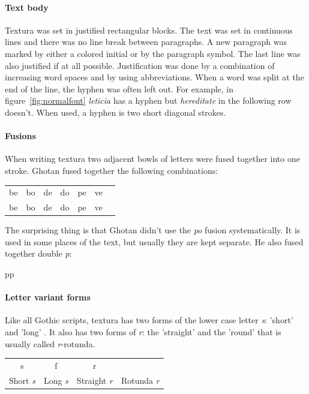\documentclass[a4paper, 12pt]{article}
\newcommand{\sample}[1]{{\mstexturafamily\fontsize{18}{18}\selectfont #1}}
\begin{document}
\paragraph{Text body} Textura was set in justified rectangular blocks.
The text was set in continuous lines and there was no line break
between paragraphs. A new paragraph was marked by either a colored
initial or by the paragraph symbol. The last line was also justified
if at all possible. Justification was done by a combination of
increasing word spaces and by using abbreviations. When a word was
split at the end of the line, the hyphen was often left out. For
example, in figure~\ref{fig:normalfont} \emph{leticia} has a hyphen
but \emph{hereditate} in the following row doesn't. When used, a
hyphen is two short diagonal strokes.

\paragraph{Fusions} 

When writing textura two adjacent bowls of letters were fused together
into one stroke. Ghotan fused together the following combinations:
\begin{center}
  \begin{tabular}{ccccccc}
  \sample{be} & \sample{bo} & \sample{de} & \sample{do} & \sample{pe}
   & \sample{ve} \\    
  be & bo & de & do & pe & ve \\
  \end{tabular}
\end{center}

The surprising thing is that Ghotan didn't use the \emph{po} fusion
systematically. It is used in some places of the text, but usually
they are kept separate. He also fused together double \emph{p}:
\begin{center}
  \sample{pp}
\end{center}


\paragraph{Letter variant forms}

Like all Gothic scripts, textura has two forms of the lower case
letter \emph{s}: 'short'  and 'long' . It also
has two forms of \emph{r}: the 'straight'  and the 'round'
\missaali{\rotundar} that is usually called \emph{r}-rotunda.

\begin{center}
  \begin{tabular}{cccc}
    \sample{s} & \sample{ſ} & \sample{r} & \sample{\rotundar} \\
    Short \emph{s} & Long \emph{s}  & Straight \emph{r} & Rotunda
    \emph{r} \\
  \end{tabular}
\end{center}
\end{document}
